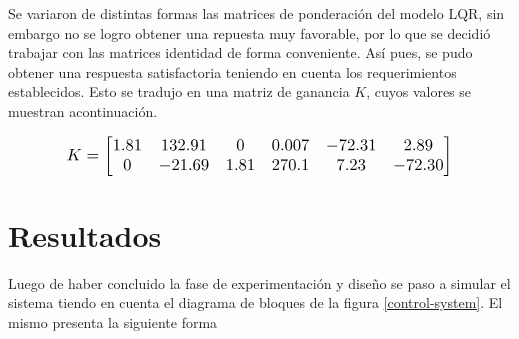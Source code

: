 \documentclass[journal,twoside,web]{ieeecolor}
\begin{document}
	Se variaron de distintas formas las matrices de ponderación del modelo LQR, sin embargo no se logro obtener una repuesta muy favorable, por lo que se decidió trabajar con las matrices identidad de forma conveniente. Así pues, se pudo obtener una respuesta satisfactoria teniendo en cuenta los requerimientos establecidos. Esto se tradujo en una matriz de ganancia $K$, cuyos valores se muestran acontinuación.
	
	\begin{equation}
	\resizebox{0.8\hsize}{!}{$%
	K = \begin{bmatrix}
			1.81 & 132.91 & 0 & 0.007 & -72.31 & 2.89 \\
			0 & -21.69 & 1.81 & 270.1 & 7.23 & -72.30 \\		
		\end{bmatrix}
		$%
		}%
	\end{equation}
	
\section{Resultados}
	
	
	Luego de haber concluido la fase de experimentación y diseño se paso a simular el sistema tiendo en cuenta el diagrama de bloques de la figura \ref{control-system}. El mismo presenta la siguiente forma
	
\end{document}
